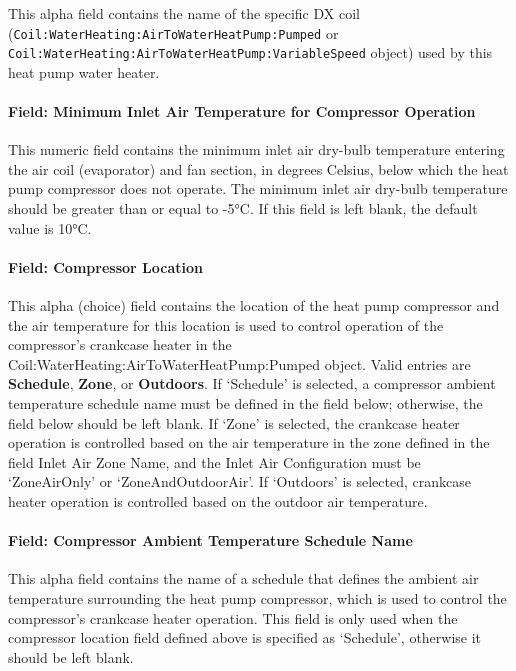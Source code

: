 This alpha field contains the name of the specific DX coil (\lstinline!Coil:WaterHeating:AirToWaterHeatPump:Pumped! or \lstinline!Coil:WaterHeating:AirToWaterHeatPump:VariableSpeed! object) used by this heat pump water heater.

\paragraph{Field: Minimum Inlet Air Temperature for Compressor Operation}\label{field-minimum-inlet-air-temperature-for-compressor-operation}

This numeric field contains the minimum inlet air dry-bulb temperature entering the air coil (evaporator) and fan section, in degrees Celsius, below which the heat pump compressor does not operate. The minimum inlet air dry-bulb temperature should be greater than or equal to -5°C. If this field is left blank, the default value is 10°C.

\paragraph{Field: Compressor Location}\label{field-compressor-location}

This alpha (choice) field contains the location of the heat pump compressor and the air temperature for this location is used to control operation of the compressor's crankcase heater in the Coil:WaterHeating:AirToWaterHeatPump:Pumped object. Valid entries are \textbf{Schedule}, \textbf{Zone}, or \textbf{Outdoors}. If `Schedule' is selected, a compressor ambient temperature schedule name must be defined in the field below; otherwise, the field below should be left blank. If `Zone' is selected, the crankcase heater operation is controlled based on the air temperature in the zone defined in the field Inlet Air Zone Name, and the Inlet Air Configuration must be `ZoneAirOnly' or `ZoneAndOutdoorAir'. If `Outdoors' is selected, crankcase heater operation is controlled based on the outdoor air temperature.

\paragraph{Field: Compressor Ambient Temperature Schedule Name}\label{field-compressor-ambient-temperature-schedule-name}

This alpha field contains the name of a schedule that defines the ambient air temperature surrounding the heat pump compressor, which is used to control the compressor's crankcase heater operation. This field is only used when the compressor location field defined above is specified as `Schedule', otherwise it should be left blank.

